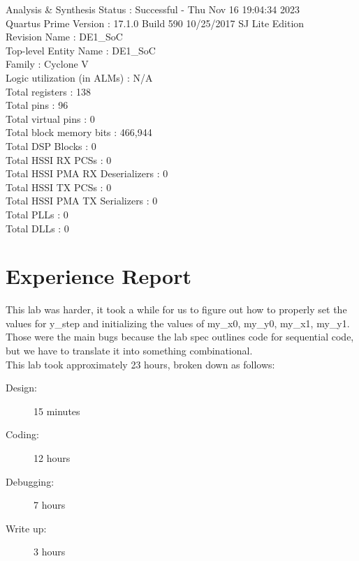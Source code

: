 \documentclass[11pt, titlepage]{article}
\begin{document}
\begin{description}
                    Analysis \& Synthesis Status : Successful - Thu Nov 16 19:04:34 2023 \\
                    Quartus Prime Version : 17.1.0 Build 590 10/25/2017 SJ Lite Edition \\
                    Revision Name : DE1\_SoC \\
                    Top-level Entity Name : DE1\_SoC \\
                    Family : Cyclone V \\
                    Logic utilization (in ALMs) : N/A \\
                    Total registers : 138 \\
                    Total pins : 96 \\
                    Total virtual pins : 0 \\
                    Total block memory bits : 466,944 \\
                    Total DSP Blocks : 0 \\
                    Total HSSI RX PCSs : 0 \\
                    Total HSSI PMA RX Deserializers : 0 \\
                    Total HSSI TX PCSs : 0 \\
                    Total HSSI PMA TX Serializers : 0 \\
                    Total PLLs : 0 \\
                    Total DLLs : 0
            \end{description}
            
    \newpage
    \section{Experience Report}
        This lab was harder, it took a while for us to figure out how to properly set the values for y\_step and initializing the values of my\_x0, my\_y0, my\_x1, my\_y1. Those were the main bugs because the lab spec outlines code for sequential code, but we have to translate it into something combinational. \\

        This lab took approximately 23 hours, broken down as follows:
        \begin{description}
            \item[Design:] 15 minutes
            \item[Coding:] 12 hours
            \item[Debugging:] 7 hours
            \item[Write up:] 3 hours
        \end{description}   
        
\end{document}
